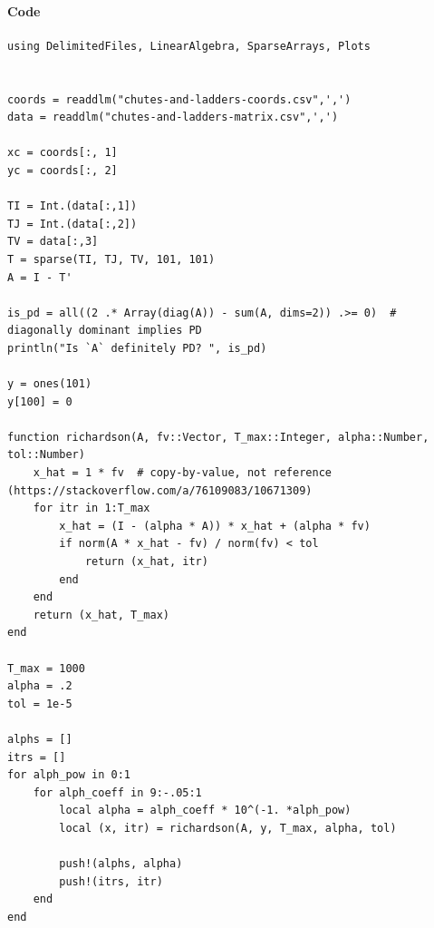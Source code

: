 \documentclass[]{exam}
\let\oldparagraph\paragraph
\renewcommand{\paragraph}[1]{\oldparagraph{#1}\mbox{}}
\begin{document}
\begin{questions}
\begin{enumerate}[label=\arabic*.]
		\paragraph{Code}
		\begin{lstlisting}
using DelimitedFiles, LinearAlgebra, SparseArrays, Plots


coords = readdlm("chutes-and-ladders-coords.csv",',')
data = readdlm("chutes-and-ladders-matrix.csv",',')

xc = coords[:, 1]
yc = coords[:, 2]

TI = Int.(data[:,1])
TJ = Int.(data[:,2])
TV = data[:,3]
T = sparse(TI, TJ, TV, 101, 101)
A = I - T'

is_pd = all((2 .* Array(diag(A)) - sum(A, dims=2)) .>= 0)  # diagonally dominant implies PD
println("Is `A` definitely PD? ", is_pd)

y = ones(101)
y[100] = 0

function richardson(A, fv::Vector, T_max::Integer, alpha::Number, tol::Number)
	x_hat = 1 * fv  # copy-by-value, not reference (https://stackoverflow.com/a/76109083/10671309)
	for itr in 1:T_max
		x_hat = (I - (alpha * A)) * x_hat + (alpha * fv)
		if norm(A * x_hat - fv) / norm(fv) < tol
			return (x_hat, itr)
		end
	end
	return (x_hat, T_max)
end

T_max = 1000
alpha = .2
tol = 1e-5

alphs = []
itrs = []
for alph_pow in 0:1
	for alph_coeff in 9:-.05:1
		local alpha = alph_coeff * 10^(-1. *alph_pow)
		local (x, itr) = richardson(A, y, T_max, alpha, tol)

		push!(alphs, alpha)
		push!(itrs, itr)
	end
end


\end{lstlisting}
\end{enumerate}
\end{questions}
\end{document}
